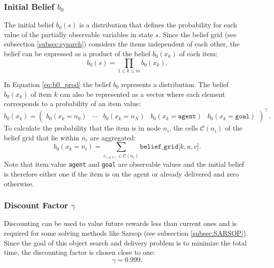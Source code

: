 \subsubsection{Initial Belief $b_0$}
The initial belief $b_0(s)$ is a distribution that defines the probability for each value of the partially observable variables in state $s$. Since the belief grid (see subsection \ref{subsec:sysarch}) considers the items independent of each other, the belief can be expressed as a product of the belief $b_0(x_k)$ of each item:
\begin{equation}\label{eq:b0_prod}
    b_0(s) = \prod_{1\leq k\leq m} b_0(x_k).
\end{equation}

In Equation \ref{eq:b0_prod} the belief $b_0$ represents a distribution. The belief $b_0(x_k)$ of item $k$ can also be represented as a vector where each element corresponds to a probability of an item value:
\begin{equation}
    b_0(x_k) = \begin{pmatrix} b_0(x_k=n_0) & \cdots & b_0(x_k=n_N) & b_0(x_k=\texttt{agent}) & b_0(x_k=\texttt{goal}) \end{pmatrix}^\intercal.
\end{equation}
To calculate the probability that the item is in node $n_i$, the cells $\mathcal{C}(n_i)$ of the belief grid that lie within $n_i$ are aggregated:
\begin{equation}
b_0\left(x_k=n_i\right) = \sum_{c_{(u,v)}\in \mathcal{C}(n_i)}\texttt{belief\_grid[$k, u, v$]}.
\end{equation}
Note that item value \texttt{agent} and \texttt{goal} are observable values and the initial belief is therefore either one if the item is on the agent or already delivered and zero otherwise. 
\subsubsection{Discount Factor $\gamma$}
Discounting can be used to value future rewards less than current ones and is required for some solving methods like Sarsop (see subsection \ref{subsec:SARSOP}). Since the goal of this object search and delivery problem is to minimize the total time, the discounting factor is chosen close to one:
\begin{equation}
    \gamma = 0.999.
\end{equation}
